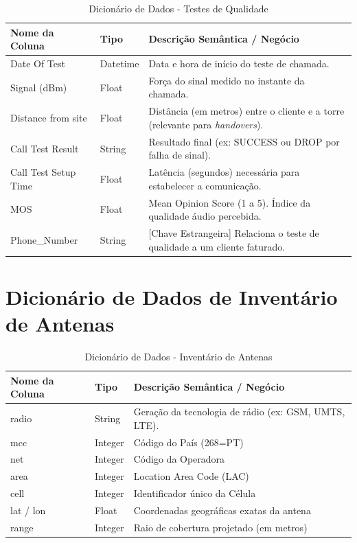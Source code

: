 \documentclass[runningheads]{llncs}
\begin{document}
\begin{table}[ht]
\centering
\caption{Dicionário de Dados - Testes de Qualidade}
\renewcommand{\arraystretch}{1.2}
\begin{tabularx}{\textwidth}{@{}l l X@{}}
\toprule
\textbf{Nome da Coluna} & \textbf{Tipo} & \textbf{Descrição Semântica / Negócio} \\
\midrule
Date Of Test & Datetime & Data e hora de início do teste de chamada. \\
Signal (dBm) & Float & Força do sinal medido no instante da chamada. \\
Distance from site & Float & Distância (em metros) entre o cliente e a torre (relevante para \textit{handovers}). \\
Call Test Result & String & Resultado final (ex: SUCCESS ou DROP por falha de sinal). \\
Call Test Setup Time & Float & Latência (segundos) necessária para estabelecer a comunicação. \\
MOS & Float & Mean Opinion Score (1 a 5). Índice da qualidade áudio percebida. \\
Phone\_Number & String & [Chave Estrangeira] Relaciona o teste de qualidade a um cliente faturado. \\
\bottomrule
\end{tabularx}
\end{table}

\clearpage

\section{Dicionário de Dados de Inventário de Antenas}
\label{anexo:dic_inventario}

\begin{table}[ht]
\centering
\caption{Dicionário de Dados - Inventário de Antenas}
\renewcommand{\arraystretch}{1.2}
\begin{tabularx}{\textwidth}{@{}l l X@{}}
\toprule
\textbf{Nome da Coluna} & \textbf{Tipo} & \textbf{Descrição Semântica / Negócio} \\
\midrule
radio & String & Geração da tecnologia de rádio (ex: GSM, UMTS, LTE). \\
mcc & Integer & Código do País (268=PT) \\
net & Integer & Código da Operadora \\
area & Integer & Location Area Code (LAC)\\
cell & Integer & Identificador único da Célula \\
lat / lon & Float & Coordenadas geográficas exatas da antena \\
range & Integer & Raio de cobertura projetado (em metros) \\
\bottomrule
\end{tabularx}
\end{table}
\end{document}
